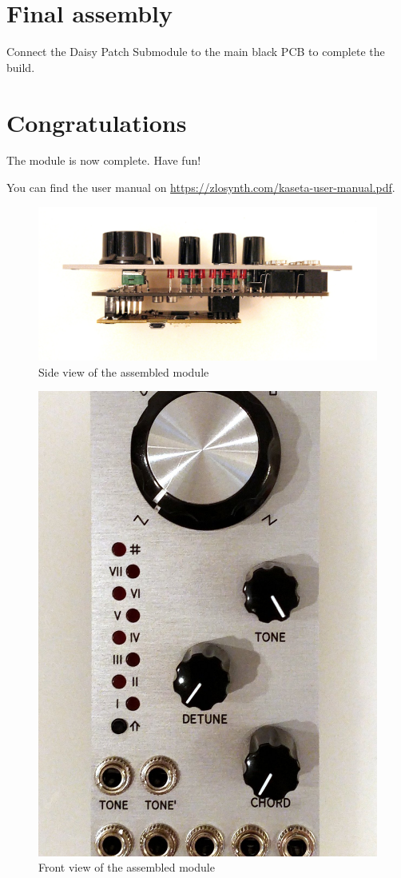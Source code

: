 \documentclass[10pt,a4paper,twocolumn]{article}
\begin{document}
\section{Final assembly}

Connect the Daisy Patch Submodule to the main black PCB to complete the build.

\section{Congratulations}

The module is now complete. Have fun!

You can find the user manual on \url{https://zlosynth.com/kaseta-user-manual.pdf}.

\begin{figure}[h]
  \centering
  \includegraphics[width=\linewidth]{p07.jpg}
  \caption{Side view of the assembled module}
\end{figure}

\begin{figure}[h]
  \centering
  \includegraphics[width=\linewidth]{p08.jpg}
  \caption{Front view of the assembled module}
\end{figure}
\end{document}

